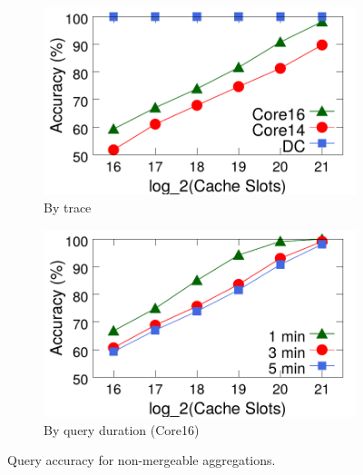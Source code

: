 \begin{figure}[ht]
\centering
\vspace{-0.1in}
\begin{subfigure}[t]{0.48\columnwidth}
\raggedright
\includegraphics[width=\linewidth]{pq_accuracy-alltraces.pdf}
\caption{By trace}
\label{fig:accuracy-traces}
\end{subfigure}
\begin{subfigure}[t]{0.48\columnwidth}
\raggedleft
\includegraphics[width=\linewidth]{pq_accuracy-core-geo.pdf}
\caption{By query duration (Core16)}
\label{fig:accuracy-time}
\end{subfigure}
\vspace{-0.1in}
\caption{Query accuracy for non-mergeable aggregations.}
\end{figure}
